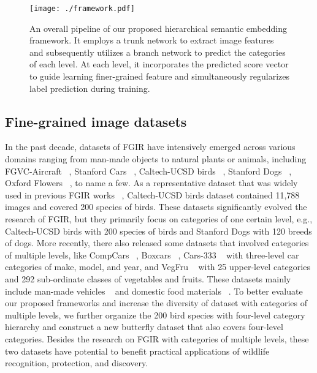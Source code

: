 \documentclass[sigconf]{acmart}
\begin{document}
\begin{figure*}[!t]
   \centering{}
   \texttt{[image: ./framework.pdf]}
   \caption{An overall pipeline of our proposed hierarchical semantic embedding framework. It employs a trunk network to extract image features and subsequently utilizes a branch network to predict the categories of each level. At each level, it incorporates the predicted score vector to guide learning finer-grained feature and simultaneously regularizes label prediction during training.}
   \label{fig:framework}
\end{figure*}


\subsection{Fine-grained image datasets}
In the past decade, datasets of FGIR have intensively emerged across various domains ranging from man-made objects to natural plants or animals, including FGVC-Aircraft ~\cite{maji2013fine}, Stanford Cars ~\cite{krause20133d}, Caltech-UCSD birds ~\cite{wah2011caltech}, Stanford Dogs ~\cite{khosla2011novel}, Oxford Flowers ~\cite{nilsback2008automated}, to name a few. As a representative dataset that was widely used in previous FGIR works ~\cite{liu2017localizing,gao2016compact,he2017fine}, Caltech-UCSD birds dataset contained 11,788 images and covered 200 species of birds. These datasets significantly evolved the research of FGIR, but they primarily focus on categories of one certain level, e.g., Caltech-UCSD birds with 200 species of birds and Stanford Dogs with 120 breeds of dogs. More recently, there also released some datasets that involved categories of multiple levels, like CompCars ~\cite{yang2015large}, Boxcars ~\cite{sochor2016boxcars}, Cars-333 ~\cite{xie2014hyper} with three-level car categories of make, model, and year, and VegFru ~\cite{hou2017vegfru} with 25 upper-level categories and 292 sub-ordinate classes of vegetables and fruits. These datasets mainly include man-made vehicles ~\cite{yang2015large,sochor2016boxcars,xie2014hyper} and domestic food materials ~\cite{hou2017vegfru}. To better evaluate our proposed frameworks and increase the diversity of dataset with categories of multiple levels, we further organize the 200 bird species with four-level category hierarchy and construct a new butterfly dataset that also covers four-level categories. Besides the research on FGIR with categories of multiple levels, these two datasets have potential to benefit practical applications of wildlife recognition, protection, and discovery.
\end{document}
